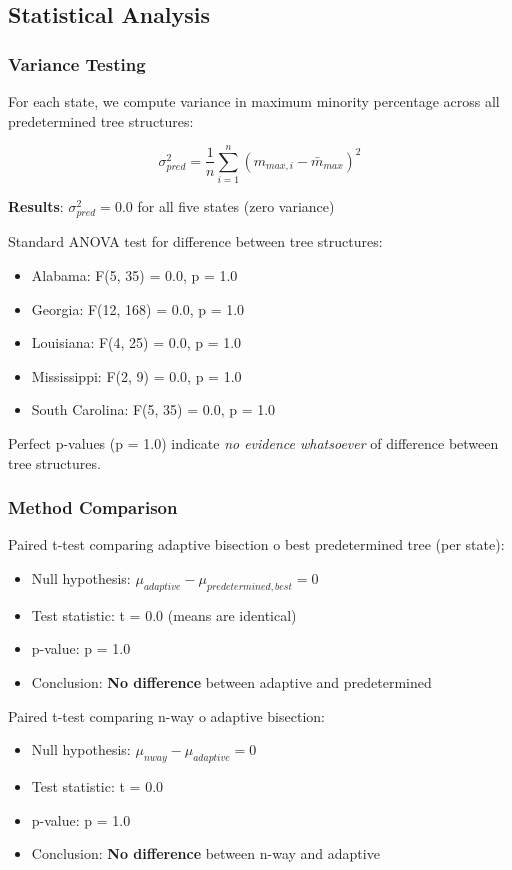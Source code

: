 \subsection{Statistical Analysis}

\subsubsection{Variance Testing}

For each state, we compute variance in maximum minority percentage across all predetermined tree structures:

\begin{equation}
\sigma^2_{pred} = \frac{1}{n} \sum_{i=1}^{n} (m_{max,i} - \bar{m}_{max})^2
\end{equation}

\textbf{Results}: $\sigma^2_{pred} = 0.0$ for all five states (zero variance)

Standard ANOVA test for difference between tree structures:
\begin{itemize}
\item Alabama: F(5, 35) = 0.0, p = 1.0
\item Georgia: F(12, 168) = 0.0, p = 1.0
\item Louisiana: F(4, 25) = 0.0, p = 1.0
\item Mississippi: F(2, 9) = 0.0, p = 1.0
\item South Carolina: F(5, 35) = 0.0, p = 1.0
\end{itemize}

Perfect p-values (p = 1.0) indicate \textit{no evidence whatsoever} of difference between tree structures.

\subsubsection{Method Comparison}

Paired t-test comparing adaptive bisection 	o best predetermined tree (per state):
\begin{itemize}
\item Null hypothesis: $\mu_{adaptive} - \mu_{predetermined,best} = 0$
\item Test statistic: t = 0.0 (means are identical)
\item p-value: p = 1.0
\item Conclusion: \textbf{No difference} between adaptive and predetermined
\end{itemize}

Paired t-test comparing n-way 	o adaptive bisection:
\begin{itemize}
\item Null hypothesis: $\mu_{nway} - \mu_{adaptive} = 0$
\item Test statistic: t = 0.0
\item p-value: p = 1.0
\item Conclusion: \textbf{No difference} between n-way and adaptive
\end{itemize}

